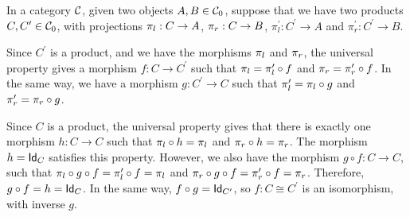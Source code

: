 \begin{solution}\label{sol:product-unique}
	In a category $ \CC $, given two objects $ A, B \in \Ob \CC $, suppose that we have two products $ C, C^\prime \in \Ob \CC $, with projections $ \projl: C \to A $, $ \projr: C \to B $, $ \pi^\prime_l: C^\prime \to A $ and $ \pi^\prime_r: C^\prime \to B $.

	Since $ C^\prime $ is a product, and we have the morphisms $ \projl $ and $ \projr $, the universal property gives a morphism $ f: C \to C^\prime $ such that $ \projl = \pi^\prime_l \circ f $ and $ \projr = \pi^\prime_r \circ f $. In the same way, we have a morphism $ g: C^\prime \to C $ such that $ \pi^\prime_l = \projl \circ g $ and $ \pi^\prime_r = \projr \circ g $.
	
	Since $ C $ is a product, the universal property gives that there is exactly one morphism $ h: C \to C $ such that $ \projl \circ h = \projl $ and $ \projr \circ h = \projr $. The morphism $ h = \Id[C] $ satisfies this property. However, we also have the morphism $ g \circ f: C \to C $, such that $ \projl \circ g \circ f = \pi^\prime_l \circ f = \projl $ and $ \projr \circ g \circ f = \pi^\prime_r \circ f = \projr $. Therefore, $ g \circ f = h = \Id[C] $. In the same way, $ f \circ g = \Id[C^\prime] $, so $ f: C \cong C^\prime $ is an isomorphism, with inverse $ g $.
\end{solution}

